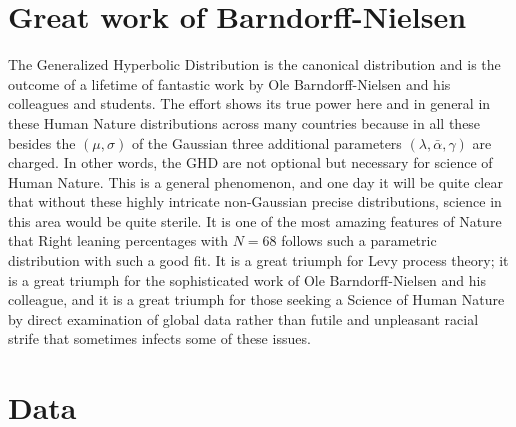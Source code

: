 \documentclass{amsart}
\begin{document}
\section{Great work of Barndorff-Nielsen}

The Generalized Hyperbolic Distribution is the canonical distribution and is the outcome of a lifetime of fantastic work by Ole Barndorff-Nielsen and his colleagues and students.  The effort shows its true power here and in general in these Human Nature distributions across many countries because in all these besides the $(\mu,\sigma)$ of the Gaussian three additional parameters $(\lambda,\bar{\alpha},\gamma)$ are charged.  In other words, the GHD are not optional but necessary for science of Human Nature.  This is a general phenomenon, and one day it will be quite clear that without these highly intricate non-Gaussian precise distributions, science in this area would be quite sterile.  It is one of the most amazing features of Nature that Right leaning percentages with $N=68$ follows such a parametric distribution with such a good fit.  It is a great triumph for Levy process theory; it is a great triumph for the sophisticated work of Ole Barndorff-Nielsen and his colleague, and it is a great triumph for those seeking a Science of Human Nature by direct examination of global data rather than futile and unpleasant racial strife that sometimes infects some of these issues.  


\section{Data}
\end{document}
